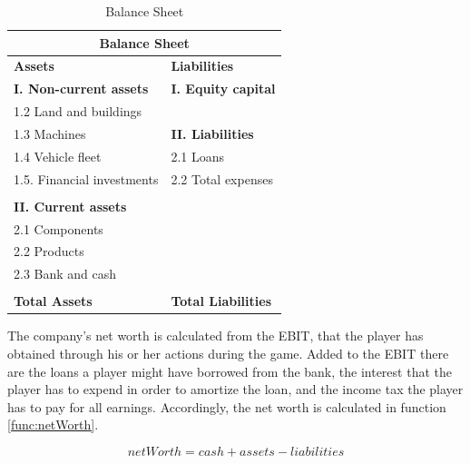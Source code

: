 \begin{table}[ht]
\begin{tabular}{|p{5.9cm}|p{5.9cm}|}
\hline
\multicolumn{2}{|c|}{\textbf{Balance Sheet}}\\
\hline \textbf{Assets} & \textbf{Liabilities}\\ 
\hline \textbf{I. Non-current assets} & \textbf{I. Equity capital}\\
\hline 1.2 Land and buildings &\\
\hline 1.3 Machines & \textbf{II. Liabilities}\\
\hline 1.4 Vehicle fleet & 2.1 Loans\\
\hline 1.5. Financial investments &  2.2 Total expenses\\
\hline &\\
\hline \textbf{II. Current assets} &\\
\hline 2.1 Components &\\
\hline 2.2 Products &\\
\hline 2.3 Bank and cash &\\
\hline &\\
\hline \textbf{Total Assets} & \textbf{Total Liabilities}\\
\hline
\end{tabular}
\caption{Balance Sheet}
\label{tab:balanceSheet}
\end{table}

The company’s net worth %
is calculated from the EBIT, that the player has obtained through his or her actions during the game. Added to the EBIT there are the loans a player might have borrowed from the bank, the interest that the player has to expend in order to amortize the loan, and the income tax the player has to pay for all earnings. Accordingly, the net worth is calculated in  function \ref{func:netWorth}.

\begin{equation}
\label{func:netWorth}
    netWorth = cash + assets - liabilities
\end{equation}

